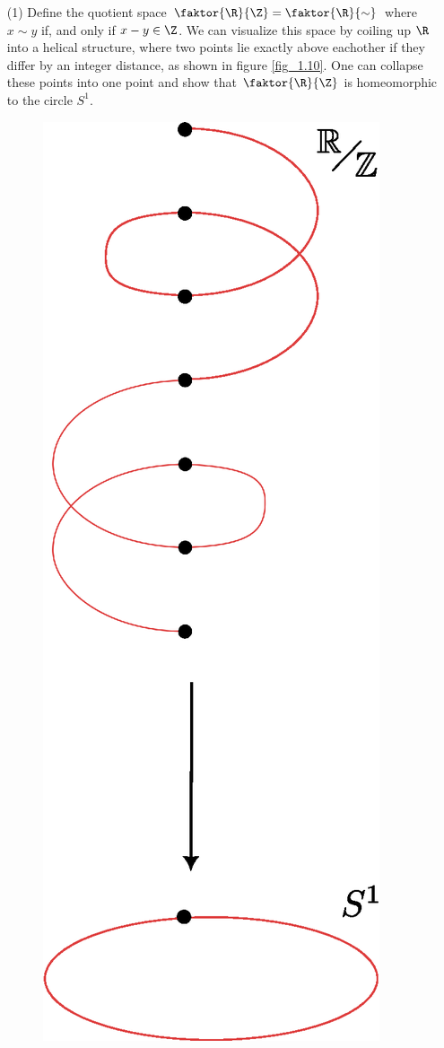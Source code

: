\begin{example}
    \begin{enumerate}
        \item[(1)] Define the quotient space $\faktor{\R}{\Z}=\faktor{\R}{\sim}$
            where $x \sim y$ if, and only if  $x-y \in \Z$. We can visualize
            this space by coiling up  $\R$ into a helical structure, where two
            points lie exactly above eachother if they differ by an integer
            distance, as shown in figure \ref{fig_1.10}. One can collapse these
            points into one point and show that $\faktor{\R}{\Z}$ is
            homeomorphic to the circle $S^1$.

            \begin{figure}[h]
                \centering
                \includegraphics[scale=0.5]{Figures/Chapter2/R_mod_Z.eps}

\end{figure}
\end{enumerate}
\end{example}
